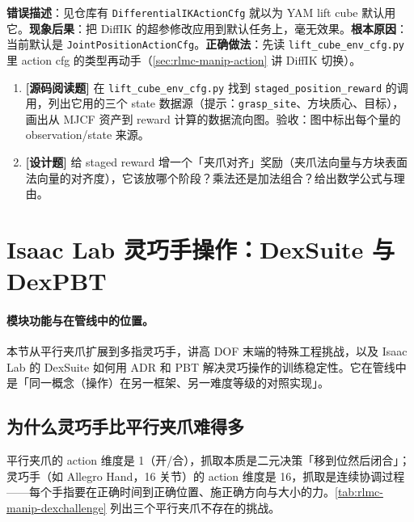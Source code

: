 \begin{pitfall}
\textbf{错误描述}：见仓库有 \verb|DifferentialIKActionCfg| 就以为 YAM lift cube 默认用它。\textbf{现象后果}：把 DiffIK 的超参修改应用到默认任务上，毫无效果。\textbf{根本原因}：当前默认是 \verb|JointPositionActionCfg|。\textbf{正确做法}：先读 \verb|lift_cube_env_cfg.py| 里 action cfg 的类型再动手（\cref{sec:rlmc-manip-action} 讲 DiffIK 切换）。
\end{pitfall}

\begin{practice}[本节练习]
\begin{enumerate}
  \item \textbf{[源码阅读题]} 在 \verb|lift_cube_env_cfg.py| 找到 \verb|staged_position_reward| 的调用，列出它用的三个 state 数据源（提示：\verb|grasp_site|、方块质心、目标），画出从 MJCF 资产到 reward 计算的数据流向图。验收：图中标出每个量的 observation/state 来源。
  \item \textbf{[设计题]} 给 staged reward 增一个「夹爪对齐」奖励（夹爪法向量与方块表面法向量的对齐度），它该放哪个阶段？乘法还是加法组合？给出数学公式与理由。
\end{enumerate}
\end{practice}

\section{Isaac Lab 灵巧手操作：DexSuite 与 DexPBT}
\label{sec:rlmc-manip-dex}

\paragraph{模块功能与在管线中的位置。}本节从平行夹爪扩展到多指灵巧手，讲高 DOF 末端的特殊工程挑战，以及 Isaac Lab 的 DexSuite 如何用 ADR 和 PBT 解决灵巧操作的训练稳定性。它在管线中是「同一概念（操作）在另一框架、另一难度等级的对照实现」。

\subsection{为什么灵巧手比平行夹爪难得多}
\label{sec:rlmc-manip-dexhard}

平行夹爪的 action 维度是 1（开/合），抓取本质是二元决策「移到位然后闭合」；灵巧手（如 Allegro Hand，16 关节）的 action 维度是 16，抓取是连续协调过程——每个手指要在正确时间到正确位置、施正确方向与大小的力。\cref{tab:rlmc-manip-dexchallenge} 列出三个平行夹爪不存在的挑战。

